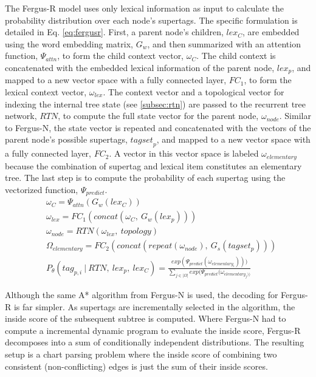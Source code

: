 \documentclass[11pt]{article}
\begin{document}
The Fergus-R model uses only lexical information as input to calculate the probability distribution over each node's supertags. 
%
The specific formulation is detailed in Eq. \ref{eq:fergusr}.
%
First, a parent node's children, $lex_C$, are embedded using the word embedding matrix, $G_w$, and then summarized with an attention function, $\Psi_{attn}$, to form the child context vector, $\omega_{C}$. 
%
The child context is concatenated with the embedded lexical information of the parent node, $lex_p$, and mapped to a new vector space with a fully connected layer, $FC_1$, to form the lexical context vector, $\omega_{lex}$.
%
The context vector and a topological vector for indexing the internal tree state (see \ref{subsec:rtn}) are passed to the recurrent tree network, $RTN$, to compute the full state vector for the parent node, $\omega_{node}$.
%
Similar to Fergus-N, the state vector is repeated and concatenated with the vectors of the parent node's possible supertags, ${tagset}_p$, and mapped to a new vector space with a fully connected layer, $FC_2$.
%
A vector in this vector space is labeled $\omega_{elementary}$ because the combination of supertag and lexical item constitutes an elementary tree.
%
The last step is to compute the probability of each supertag using the vectorized function, $\Psi_{predict}$.
%
\begin{align}
&\omega_{C} = \Psi_{attn}(G_w(lex_C)) \label{eq:fergusr} \\
&\omega_{lex} = FC_1(concat(\omega_{C},~G_w(lex_p))) \nonumber \\
&\omega_{node} = RTN(\omega_{lex},~topology) \nonumber \\
&\Omega_{elementary} = FC_2(concat(repeat(\omega_{node}),~G_s(tagset_p))) \nonumber \\
&P_\theta(tag_{p,i}~|~RTN,~lex_p,~lex_{C}) = 
\frac{exp(\Psi_{predict}(\omega_{elementary_i})))}
{\sum_{j \in |\Omega|} exp(\Psi_{predict}(\omega_{elementary_j))}} \nonumber
\end{align}

Although the same A* algorithm from Fergus-N is used, the decoding for Fergus-R is far simpler.
%
As supertags are incrementally selected in the algorithm, the inside score of the subsequent subtree is computed.  
%
Where Fergus-N had to compute a incremental dynamic program to evaluate the inside score, Fergus-R decomposes into a sum of conditionally independent distributions. 
%
The resulting setup is a chart parsing problem where the inside score of combining two consistent (non-conflicting) edges is just the sum of their inside scores. 
\end{document}
